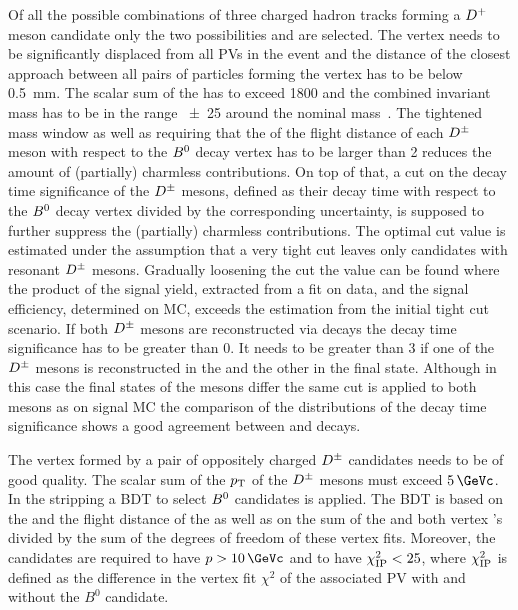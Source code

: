 Of all the possible combinations of three charged hadron tracks forming a
${{D}^+}$ meson candidate only the two possibilities \DToKpipi and \DToKKpi are
selected. The vertex needs to be significantly displaced from all PVs in the event
and the distance of the closest approach between all pairs of particles
forming the vertex has to be below \SI{0.5}{\mm}. The scalar sum of the \pT
has to exceed \SI{1800}{\MeVc} and the combined invariant mass has to be in
the range \SI{\pm25}{\MeVcc} around the nominal \Dp mass~\cite{PDG2014}. The
tightened mass window as well as requiring that the \chisq of the flight
distance of each ${{D}^\pm}$ meson with respect to the ${{B}^0}$ decay vertex has to be
larger than \num{2} reduces the amount of (partially) charmless contributions.
On top of that, a cut on the decay time significance of the ${{D}^\pm}$ mesons,
defined as their decay time with respect to the ${{B}^0}$ decay vertex divided by
the corresponding uncertainty, is supposed to further suppress the (partially)
charmless contributions. The optimal cut value is estimated under the
assumption that a very tight cut leaves only candidates with resonant ${{D}^\pm}$
mesons. Gradually loosening the cut the value can be found where the product
of the \Bd signal yield, extracted from a fit on data, and the signal
efficiency, determined on MC, exceeds the estimation from the initial tight
cut scenario. If both ${{D}^\pm}$ mesons are reconstructed via \DToKpipi decays the
decay time significance has to be greater than \num{0}. It needs to be greater
than \num{3} if one of the ${{D}^\pm}$ mesons is reconstructed in the \KKpi and the
other in the \Kpipi final state. Although in this case the final states
of the \Dpm mesons differ the same cut is applied to both \Dpm mesons as on
signal MC the comparison of the distributions of the decay time significance
shows a good agreement between \DToKpipi and \DToKKpi decays.

The vertex formed by a pair of oppositely charged ${{D}^\pm}$ candidates needs to
be of good quality. The scalar sum of the $p_{\text{T}}$ of the ${{D}^\pm}$ mesons must
exceed $\SI{5}{\GeVc}$. In the stripping a BDT to select ${{B}^0}$ candidates is
applied. The BDT is based on the \pT and the flight distance \chisq of the \Bz
as well as on the sum of the \Bz and both \PD vertex \chisq's divided by the
sum of the degrees of freedom of these vertex fits. Moreover, the \Bd
candidates are required to have $p > \SI{10}{\GeVc}$ and to have
$\chi^2_{\text{IP}}<\num{25}$, where $\chi^2_{\text{IP}}$ is defined as the difference in the
vertex fit $\chi^2$ of the associated PV with and without the $B^0$ candidate.


